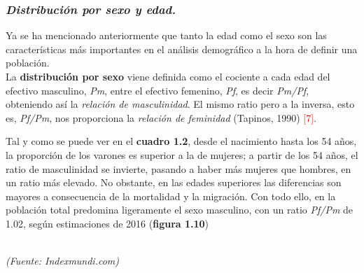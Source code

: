 \vspace{-0.3cm}

\subsubsection*{\textit{Distribuci\'on por sexo y edad.}}

Ya se ha mencionado anteriormente que tanto la edad como el sexo son las caracter\'isticas m\'as importantes en el an\'alisis demogr\'afico a la hora de definir una poblaci\'on.\\

\indent La \textbf{distribuci\'on por sexo} viene definida como el cociente a cada edad del efectivo masculino, \textit{Pm}, entre el efectivo femenino, \textit{Pf}, es decir \textit{Pm/Pf}, obteniendo as\'i la \textit{relaci\'on de masculinidad}. El mismo ratio pero a la inversa, esto es, \textit{Pf/Pm}, nos proporciona la \textit{relaci\'on de feminidad} (Tapinos, 1990) \textcolor{red}{[7]}.

Tal y como se puede ver en el \textbf{cuadro 1.2}, desde el nacimiento hasta los 54 a\~nos, la proporci\'on de los varones es superior a la de mujeres; a partir de los 54 a\~nos, el ratio de masculinidad se invierte, pasando a haber m\'as mujeres que hombres, en un ratio m\'as elevado. No obstante, en las edades superiores las diferencias son mayores a consecuencia de la mortalidad y la migraci\'on. Con todo ello, en la poblaci\'on total predomina ligeramente el sexo masculino, con un ratio \textit{Pf/Pm} de 1.02, seg\'un estimaciones de 2016 (\textbf{figura 1.10})\\

\vspace{-0.4cm}
\begin{table}[!htp]
 \begin{center}
 \hspace*{-0.3cm}\vspace{-0.2cm}
\caption{Ratio de sexo por intervalo de edad}\\
\textit{\small{(Fuente: Indexmundi.com)}}
   \label{tab:table1}
  \end{center}
\end{table}

